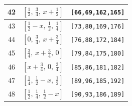 \documentclass[fleqn,8pt]{jsarticle}
\begin{document}
\begin{longtable}{ccc}
42 & $\left[ \frac{1}{2},\, \frac{3}{4},\, x + \frac{1}{2} \right]$ & {\tt [66,69,162,165]} \\ \hline
43 & $\left[ \frac{1}{2} - x,\, \frac{1}{2},\, \frac{1}{4} \right]$ & {\tt [73,80,169,176]} \\ \hline
44 & $\left[ 0,\, \frac{3}{4},\, x + \frac{3}{4} \right]$ & {\tt [76,88,172,184]} \\ \hline
45 & $\left[ \frac{3}{4},\, x + \frac{3}{4},\, 0 \right]$ & {\tt [79,84,175,180]} \\ \hline
46 & $\left[ x + \frac{3}{4},\, 0,\, \frac{3}{4} \right]$ & {\tt [85,86,181,182]} \\ \hline
47 & $\left[ \frac{1}{4},\, \frac{1}{2} - x,\, \frac{1}{2} \right]$ & {\tt [89,96,185,192]} \\ \hline
48 & $\left[ \frac{1}{2},\, \frac{1}{4},\, \frac{1}{2} - x \right]$ & {\tt [90,93,186,189]} \\
\end{longtable}
\renewcommand{\arraystretch}{1.2}
\end{document}
